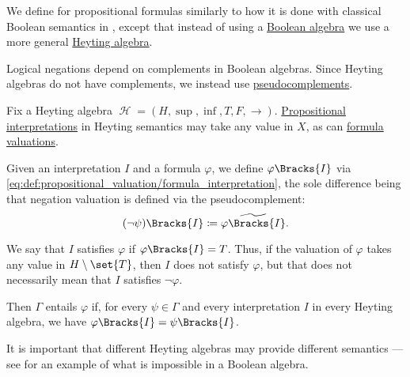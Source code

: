 \begin{definition}\label{def:propositional_heyting_algebra_semantics}
  We define  for propositional formulas similarly to how it is done with classical Boolean semantics in , except that instead of using a \hyperref[def:boolean_algebra]{Boolean algebra} we use a more general \hyperref[def:heyting_algebra]{Heyting algebra}.

  Logical negations depend on complements in Boolean algebras. Since Heyting algebras do not have complements, we instead use \hyperref[def:heyting_algebra/pseudocomplement]{pseudocomplements}.

  Fix a Heyting algebra \( \mscrH = (H, \sup, \inf, T, F, \rightarrow) \). \hyperref[def:propositional_valuation/interpretation]{Propositional interpretations} in Heyting semantics may take any value in \( X \), as can \hyperref[def:propositional_valuation/formula_valuation]{formula valuations}.

  Given an interpretation \( I \) and a formula \( \varphi \), we define \( \varphi\Bracks{I} \) via \eqref{eq:def:propositional_valuation/formula_interpretation}, the sole difference being that negation valuation is defined via the pseudocomplement:
  \begin{equation*}
    (\neg \psi)\Bracks{I} \coloneqq \widetilde{\varphi\Bracks{I}}.
  \end{equation*}

  We say that \( I \) satisfies \( \varphi \) if \( \varphi\Bracks{I} = T \). Thus, if the valuation of \( \varphi \) takes any value in \( H \setminus \set{ T } \), then \( I \) does not satisfy \( \varphi \), but that does not necessarily mean that \( I \) satisfies \( \neg \varphi \).

  Then \( \Gamma \) entails \( \varphi \) if, for every \( \psi \in \Gamma \) and every interpretation \( I \) in every Heyting algebra, we have \( \varphi\Bracks{I} = \psi\Bracks{I} \).

  It is important that different Heyting algebras may provide different semantics --- see  for an example of what is impossible in a Boolean algebra.
\end{definition}

